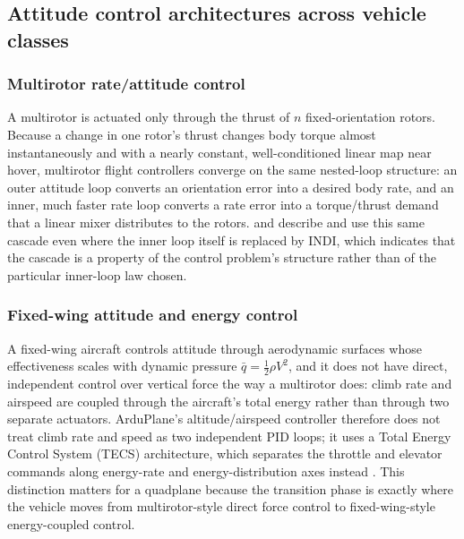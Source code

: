 \documentclass{article}
\begin{document}
\subsection{Attitude control architectures across vehicle classes}
\label{sec:architectures}

\subsubsection{Multirotor rate/attitude control}
A multirotor is actuated only through the thrust of $n$ fixed-orientation rotors. Because a change in one rotor's thrust changes body torque almost instantaneously and with a nearly constant, well-conditioned linear map near hover, multirotor flight controllers converge on the same nested-loop structure: an outer attitude loop converts an orientation error into a desired body rate, and an inner, much faster rate loop converts a rate error into a torque/thrust demand that a linear mixer distributes to the rotors. \citet{lombaerts2019} and \citet{zhou2023} describe and use this same cascade even where the inner loop itself is replaced by INDI, which indicates that the cascade is a property of the control problem's structure rather than of the particular inner-loop law chosen.

\subsubsection{Fixed-wing attitude and energy control}
\label{sec:tecs}
A fixed-wing aircraft controls attitude through aerodynamic surfaces whose effectiveness scales with dynamic pressure $\bar{q}=\tfrac{1}{2}\rho V^{2}$, and it does not have direct, independent control over vertical force the way a multirotor does: climb rate and airspeed are coupled through the aircraft's total energy rather than through two separate actuators. ArduPlane's altitude/airspeed controller therefore does not treat climb rate and speed as two independent PID loops; it uses a Total Energy Control System (TECS) architecture, which separates the throttle and elevator commands along energy-rate and energy-distribution axes instead \citep{lambregts1983tecs,ardupilotdocs}. This distinction matters for a quadplane because the transition phase is exactly where the vehicle moves from multirotor-style direct force control to fixed-wing-style energy-coupled control.
\end{document}
